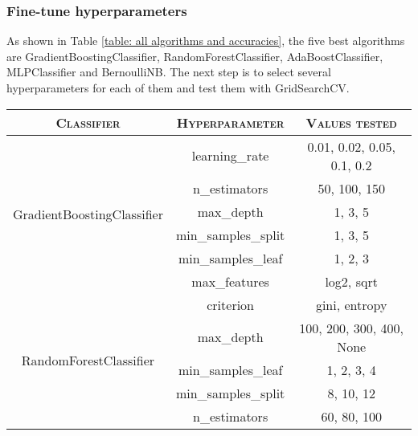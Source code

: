 \documentclass[12pt]{article}
\begin{document}
\subsubsection{Fine-tune hyperparameters}
As shown in Table \ref{table: all algorithms and accuracies}, the five best algorithms are GradientBoostingClassifier, RandomForestClassifier, AdaBoostClassifier, MLPClassifier and BernoulliNB. The next step is to select several hyperparameters for each of them and test them with GridSearchCV.
\begin{table}[ht]
    \centering
    \begin{tabular}{ccc}
        \toprule
        \textsc{Classifier}                         & \textsc{Hyperparameter} & \textsc{Values tested}                   \\
        \midrule
        \multirow{6}{*}{GradientBoostingClassifier} & learning\_rate          & 0.01, 0.02, 0.05, 0.1, 0.2               \\
                                                    & n\_estimators           & 50, 100, 150                             \\
                                                    & max\_depth              & 1, 3, 5                                  \\
                                                    & min\_samples\_split     & 1, 3, 5                                  \\
                                                    & min\_samples\_leaf      & 1, 2, 3                                  \\
                                                    & max\_features           & log2, sqrt                               \\
        \midrule
        \multirow{5}{*}{RandomForestClassifier}     & criterion               & gini, entropy                            \\
                                                    & max\_depth              & 100, 200, 300, 400, None                 \\
                                                    & min\_samples\_leaf      & 1, 2, 3, 4                               \\
                                                    & min\_samples\_split     & 8, 10, 12                                \\
                                                    & n\_estimators           & 60, 80, 100                              \\

\end{tabular}
\end{table}
\end{document}
